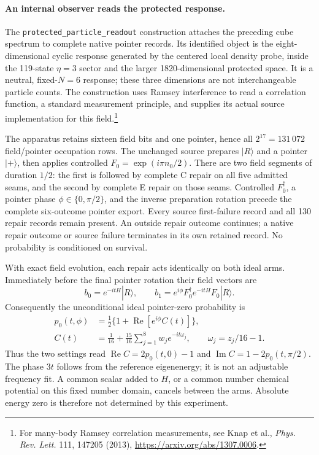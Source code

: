 \paragraph{An internal observer reads the protected response.}
The \texttt{protected\_particle\_readout} construction attaches the preceding
cube spectrum to complete native pointer records.  Its identified object is
the eight-dimensional cyclic response generated by the centered local density
probe, inside the 119-state $\eta=3$ sector and the larger 1820-dimensional
protected space.  It is a neutral, fixed-$N=6$ response; these three dimensions
are not interchangeable particle counts.  The construction uses Ramsey
interference to read a correlation function, a standard measurement principle,
and supplies its actual source implementation for this field.\footnote{For
many-body Ramsey correlation measurements, see Knap et al.,
\emph{Phys. Rev. Lett.} 111, 147205 (2013),
\url{https://arxiv.org/abs/1307.0006}.}

The apparatus retains sixteen field bits and one pointer, hence all
$2^{17}=131\,072$ field/pointer occupation rows.  The unchanged source prepares
$|R\rangle$ and a pointer $|+\rangle$, then applies controlled
$F_0=\exp(i\pi n_0/2)$.  There are two field segments of duration $1/2$:
the first is followed by complete C repair on all five admitted seams, and
the second by complete E repair on those seams.  Controlled $F_0^\dagger$,
a pointer phase $\phi\in\{0,\pi/2\}$, and the inverse preparation rotation
precede the complete six-outcome pointer export.  Every source first-failure
record and all 130 repair records remain present.  An outside repair outcome
continues; a native repair outcome or source failure terminates in its own
retained record.  No probability is conditioned on survival.

With exact field evolution, each repair acts identically on both ideal arms.
Immediately before the final pointer rotation their field vectors are
\[
 b_0=e^{-itH}|R\rangle,\qquad
 b_1=e^{i\phi}F_0^\dagger e^{-itH}F_0|R\rangle.
\]
Consequently the unconditional ideal pointer-zero probability is
\begin{align*}
 p_0(t,\phi)&=\tfrac12\{1+\operatorname{Re}[e^{i\phi}C(t)]\},\\
 C(t)&=\frac1{16}+\frac{15}{16}\sum_{j=1}^{8}
 w_j e^{-it\omega_j},\qquad \omega_j=z_j/16-1.
\end{align*}
Thus the two settings read $\operatorname{Re}C=2p_0(t,0)-1$ and
$\operatorname{Im}C=1-2p_0(t,\pi/2)$.  The phase $3t$ follows from the
reference eigenenergy; it is not an adjustable frequency fit.  A common
scalar added to $H$, or a common number chemical potential on this fixed
number domain, cancels between the arms.  Absolute energy zero is therefore
not determined by this experiment.

